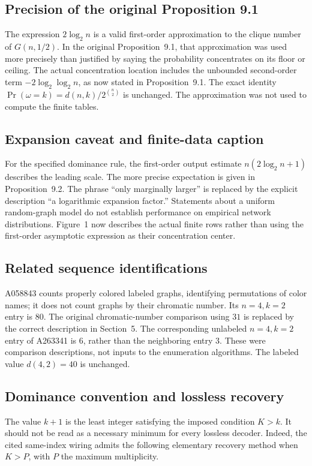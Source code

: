 \documentclass[11pt,a4paper]{article}
\theoremstyle{definition}
\begin{document}
\subsection{Precision of the original Proposition 9.1}
The expression $2\log_2n$ is a valid first-order approximation to
the clique number of $G(n,1/2)$. In the original Proposition~9.1,
that approximation was used more precisely than justified by saying
the probability concentrates on its floor or ceiling. The actual
concentration location includes the unbounded second-order term
$-2\log_2\log_2n$, as now stated in Proposition~9.1.
The exact identity $\Pr(\omega=k)=d(n,k)/2^{\binom n2}$ is unchanged.
The approximation was not used to compute the finite tables.

\subsection{Expansion caveat and finite-data caption}
For the specified dominance rule, the first-order output estimate
$n(2\log_2n+1)$ describes the leading scale. The more precise
expectation is given in Proposition~9.2. The phrase ``only
marginally larger'' is replaced by the explicit description
``a logarithmic expansion factor.'' Statements about a uniform
random-graph model do not establish performance on empirical
network distributions. Figure~1 now describes the actual finite
rows rather than using the first-order asymptotic expression as
their concentration center.

\subsection{Related sequence identifications}
A058843 counts properly colored labeled graphs, identifying
permutations of color names; it does not count graphs by their
chromatic number. Its $n=4,k=2$ entry is $80$. The original
chromatic-number comparison using $31$ is replaced by the correct
description in Section~5. The corresponding unlabeled
$n=4,k=2$ entry of A263341 is $6$, rather than the neighboring
entry $3$. These were comparison descriptions, not inputs to the
enumeration algorithms. The labeled value $d(4,2)=40$ is unchanged.

\subsection{Dominance convention and lossless recovery}
The value $k+1$ is the least integer satisfying the imposed
condition $K>k$. It should not be read as a necessary minimum for
every lossless decoder. Indeed, the cited same-index wiring admits
the following elementary recovery method when $K>P$, with $P$
the maximum multiplicity.
\end{document}
